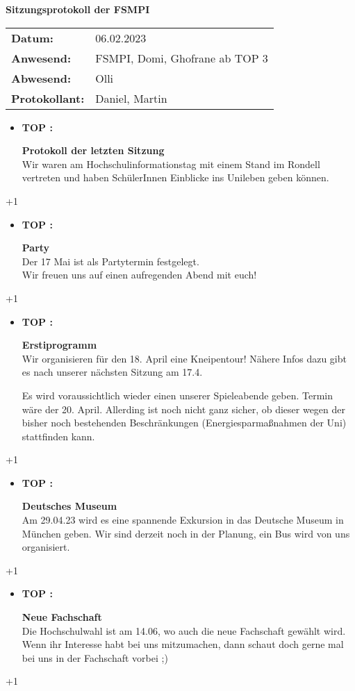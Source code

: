 \documentclass[paper=a4,bibliography=totoc,BCOR=0mm,numbers=noenddot,fontsize=12pt]{scrreprt}
\newcommand{\tops}[2]{\begin{itemize}\item \begin{large}\textbf{TOP \the\numm :~}\end{large}\textbf{#1} \\ #2 \end{itemize} 
\advance\numm +1}
\begin{document}
\begin{Huge}
\textbf{Sitzungsprotokoll der FSMPI}
\end{Huge}\hfill
{}
\vspace{5ex}

\begin{tabular}{l l}
\textbf{Datum:}& 06.02.2023\\
\textbf{Anwesend:}& FSMPI, Domi, Ghofrane ab TOP 3\\
\textbf{Abwesend:}& Olli\\
\textbf{Protokollant:}& Daniel, Martin
\vspace{5ex}
\end{tabular}
%

\tops{Protokoll der letzten Sitzung}{
Wir waren am Hochschulinformationstag mit einem Stand im Rondell vertreten und haben SchülerInnen Einblicke ins Unileben geben können.
}

\tops{Party}{
Der 17 Mai ist als Partytermin festgelegt.\\
Wir freuen uns auf einen aufregenden Abend mit euch!
}

\tops{Erstiprogramm}{

Wir organisieren für den 18. April eine Kneipentour! Nähere Infos dazu gibt es nach unserer nächsten Sitzung am 17.4.

Es wird voraussichtlich wieder einen unserer Spieleabende geben. Termin wäre der 20. April. Allerding ist noch nicht ganz sicher, ob dieser wegen der bisher noch bestehenden Beschränkungen (Energiesparmaßnahmen der Uni) stattfinden kann.
}


\tops{Deutsches Museum}{
Am 29.04.23 wird es eine spannende Exkursion in das Deutsche Museum in München geben. Wir sind derzeit noch in der Planung, ein Bus wird von uns organisiert. 
}

\tops{Neue Fachschaft}{
    Die Hochschulwahl ist am 14.06, wo auch die neue Fachschaft gewählt wird. Wenn ihr Interesse habt bei uns mitzumachen, dann schaut doch gerne mal bei uns in der Fachschaft vorbei ;)
}
\end{document}
